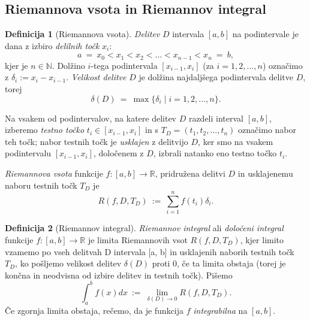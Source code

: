 \documentclass[11pt]{article}
\theoremstyle{definition}
\newtheorem{definicija}{Definicija}[section]
\theoremstyle{definition}
\theoremstyle{definition}
\theoremstyle{theorem}
\begin{document}

\subsection{Riemannova vsota in Riemannov integral}
\vspace{0.5cm}

\begin{definicija}[Riemannova vsota]

\textit{Delitev} $D$ intervala $[a, b]$ na podintervale je dana z izbiro \textit{delilnih točk} $x_i$:
$$a ~=~ x_0 < x_1 < x_2 < \ldots < x_{n-1} < x_n ~=~ b,$$
kjer je $n \in \mathbb{N}$. Dolžino $i$-tega podintervala $[x_{i-1},x_i]$ (za $i=1,2,...,n$) označimo z $\delta_i := x_i - x_{i-1}$. \textit{Velikost delitve} $D$ je dolžina najdaljšega podintervala delitve $D$, torej
$$\delta(D) ~=~ \max{\{\delta_i \mid i = 1, 2, ..., n\}}.$$

Na vsakem od podintervalov, na katere delitev $D$ razdeli interval $[a, b]$, izberemo \textit{testno točko} $t_i \in [x_{i-1}, x_i]$ in s $T_D = (t_1, t_2, \dots, t_n)$ označimo nabor teh točk; nabor testnih točk je \textit{usklajen} z delitvijo $D$, ker smo na vsakem podintervalu $[x_{i-1},x_i]$, določenem z $D$, izbrali natanko eno testno točko $t_i$.

\textit{Riemannova vsota} funkcije $f:[a, b] \rightarrow \mathbb{R}$, pridružena delitvi $D$ in usklajenemu naboru testnih točk $T_D$ je 
$$R(f, D, T_D) ~:=~ \sum_{i=1}^{n} f(t_i) \delta_i.$$

\end{definicija}
\vspace{0.5cm}

\pagebreak

\begin{definicija}[Riemannov integral]

\textit{Riemannov integral} ali \textit{določeni integral} funkcije $f: [a, b] \rightarrow \mathbb{R}$ je limita Riemannovih vsot $R(f, D, T_D)$, kjer limito vzamemo po vseh delitvah D intervala [a, b] in usklajenih naborih testnih točk $T_D$, ko pošljemo velikost delitev $\delta(D)$ proti $0$, če ta limita obstaja (torej je končna in neodvisna od izbire delitev in testnih točk). Pišemo
$$\int_{a}^{b} f(x) dx ~:=~ \lim_{\delta(D) \rightarrow 0} R(f, D, T_D).$$
Če zgornja limita obstaja, rečemo, da je funkcija $f$ \textit{integrabilna} na $[a, b]$.

\end{definicija}
\vspace{0.5cm}
\end{document}
